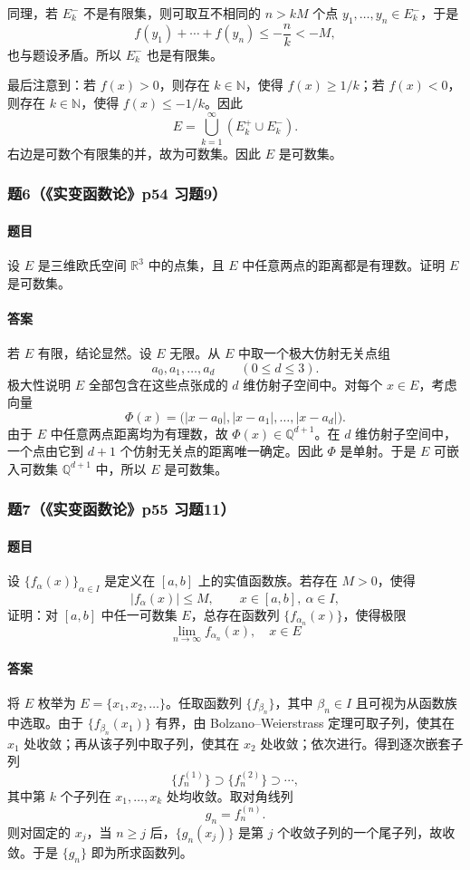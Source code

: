 \documentclass{article}
\newcommand{\R}{\mathbb{R}}
\newcommand{\Q}{\mathbb{Q}}
\newcommand{\N}{\mathbb{N}}
\begin{document}
	同理，若 $E_k^-$ 不是有限集，则可取互不相同的 $n>kM$ 个点 $y_1,\ldots,y_n\in E_k^-$，于是
	\[
	f(y_1)+\cdots+f(y_n)\le -\frac{n}{k}<-M,
	\]
	也与题设矛盾。所以 $E_k^-$ 也是有限集。
	
	最后注意到：若 $f(x)>0$，则存在 $k\in\N$，使得 $f(x)\ge 1/k$；若 $f(x)<0$，则存在 $k\in\N$，使得 $f(x)\le -1/k$。因此
	\[
	E=\bigcup_{k=1}^{\infty}\left(E_k^+\cup E_k^-\right).
	\]
	右边是可数个有限集的并，故为可数集。因此 $E$ 是可数集。
	
	\subsubsection*{题6（《实变函数论》p54 习题9）}
	\paragraph{题目}设 $E$ 是三维欧氏空间 $\R^3$ 中的点集，且 $E$ 中任意两点的距离都是有理数。证明 $E$ 是可数集。
	
	\paragraph{答案}若 $E$ 有限，结论显然。设 $E$ 无限。从 $E$ 中取一个极大仿射无关点组
	\[
	a_0,a_1,\ldots,a_d\qquad (0\le d\le 3).
	\]
	极大性说明 $E$ 全部包含在这些点张成的 $d$ 维仿射子空间中。对每个 $x\in E$，考虑向量
	\[
	\Phi(x)=\bigl(|x-a_0|,|x-a_1|,\ldots,|x-a_d|\bigr).
	\]
	由于 $E$ 中任意两点距离均为有理数，故 $\Phi(x)\in\Q^{d+1}$。在 $d$ 维仿射子空间中，一个点由它到 $d+1$ 个仿射无关点的距离唯一确定。因此 $\Phi$ 是单射。于是 $E$ 可嵌入可数集 $\Q^{d+1}$ 中，所以 $E$ 是可数集。
	
	\subsubsection*{题7（《实变函数论》p55 习题11）}
	\paragraph{题目}设 $\{f_\alpha(x)\}_{\alpha\in I}$ 是定义在 $[a,b]$ 上的实值函数族。若存在 $M>0$，使得
	\[
	|f_\alpha(x)|\le M,\qquad x\in[a,b],\ \alpha\in I,
	\]
	证明：对 $[a,b]$ 中任一可数集 $E$，总存在函数列 $\{f_{\alpha_n}(x)\}$，使得极限
	\[
	\lim_{n\to\infty}f_{\alpha_n}(x),\quad x\in E
	\]
	
	\paragraph{答案}将 $E$ 枚举为 $E=\{x_1,x_2,\ldots\}$。任取函数列 $\{f_{\beta_n}\}$，其中 $\beta_n\in I$ 且可视为从函数族中选取。由于 $\{f_{\beta_n}(x_1)\}$ 有界，由 Bolzano--Weierstrass 定理可取子列，使其在 $x_1$ 处收敛；再从该子列中取子列，使其在 $x_2$ 处收敛；依次进行。得到逐次嵌套子列
	\[
	\{f^{(1)}_n\}\supset\{f^{(2)}_n\}\supset\cdots,
	\]
	其中第 $k$ 个子列在 $x_1,
	\ldots,x_k$ 处均收敛。取对角线列
	\[
	g_n=f^{(n)}_n.
	\]
	则对固定的 $x_j$，当 $n\ge j$ 后，$\{g_n(x_j)\}$ 是第 $j$ 个收敛子列的一个尾子列，故收敛。于是 $\{g_n\}$ 即为所求函数列。
	
\end{document}
